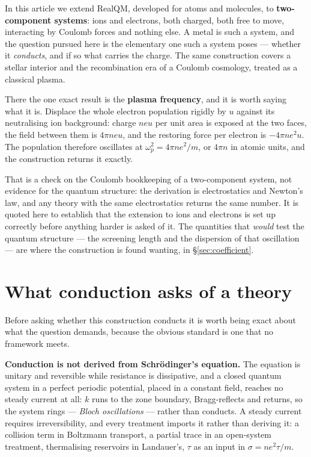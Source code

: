 \documentclass[11pt]{article}
\begin{document}
In this article we extend RealQM, developed for atoms and molecules, to \textbf{two-component
systems}: ions and electrons, both charged, both free to move, interacting by Coulomb forces and
nothing else. A metal is such a system, and the question pursued here is the elementary one such a
system poses --- whether it \emph{conducts}, and if so what carries the charge. The same
construction covers a stellar interior and the recombination era of a Coulomb cosmology, treated as
a classical plasma.

There the one exact result is the \textbf{plasma frequency}, and it is worth saying what it is.
Displace the whole electron population rigidly by $u$ against its neutralising ion background: charge
$neu$ per unit area is exposed at the two faces, the field between them is $4\pi neu$, and the
restoring force per electron is $-4\pi ne^2u$. The population therefore oscillates at
$\omega_p^2=4\pi ne^2/m$, or $4\pi n$ in atomic units, and the construction returns it exactly.

That is a check on the Coulomb bookkeeping of a two-component system, not evidence for the quantum
structure: the derivation is electrostatics and Newton's law, and any theory with the same
electrostatics returns the same number. It is quoted here to establish that the extension to ions
and electrons is set up correctly before anything harder is asked of it. The quantities that
\emph{would} test the quantum structure --- the screening length and the dispersion of that
oscillation --- are where the construction is found wanting, in \S\ref{sec:coefficient}.

\section{What conduction asks of a theory}\label{sec:bar}

Before asking whether this construction conducts it is worth being exact about what the question
demands, because the obvious standard is one that no framework meets.

\textbf{Conduction is not derived from Schr\"odinger's equation.} The equation is unitary and
reversible while resistance is dissipative, and a closed quantum system in a perfect periodic
potential, placed in a constant field, reaches no steady current at all: $k$ runs to the zone
boundary, Bragg-reflects and returns, so the system rings --- \emph{Bloch oscillations} --- rather
than conducts. A steady current requires irreversibility, and every treatment imports it rather than
deriving it: a collision term in Boltzmann transport, a partial trace in an open-system treatment,
thermalising reservoirs in Landauer's, $\tau$ as an input in $\sigma=ne^2\tau/m$.
\end{document}
